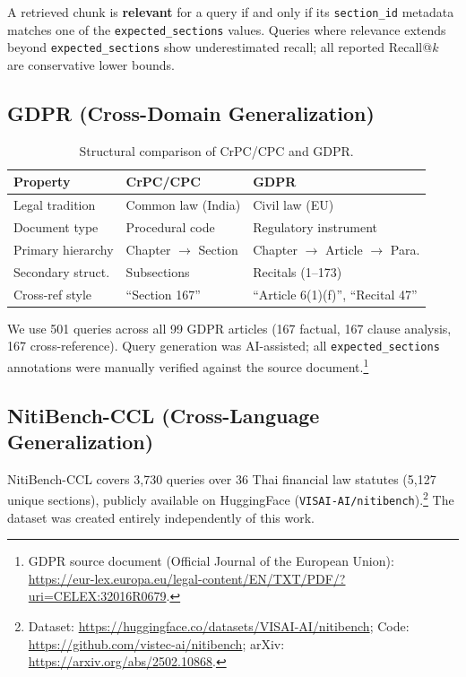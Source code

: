 \documentclass[sn-mathphys,Numbered]{sn-jnl}%
\begin{document}
A retrieved chunk is \textbf{relevant} for a query if and only if its
\texttt{section\_id} metadata matches one of the \texttt{expected\_sections}
values.  Queries where relevance extends beyond \texttt{expected\_sections}
show underestimated recall; all reported Recall@$k$ are conservative lower
bounds.

\subsection{GDPR (Cross-Domain Generalization)}

\begin{table}[htbp]
\centering
\begin{tabular}{lll}
\toprule
\textbf{Property} & \textbf{CrPC/CPC} & \textbf{GDPR} \\
\midrule
Legal tradition   & Common law (India)  & Civil law (EU) \\
Document type     & Procedural code     & Regulatory instrument \\
Primary hierarchy & Chapter $\to$ Section & Chapter $\to$ Article $\to$ Para.\\
Secondary struct. & Subsections         & Recitals (1--173) \\
Cross-ref style   & ``Section 167''     & ``Article 6(1)(f)'', ``Recital 47'' \\
\bottomrule
\end{tabular}
\caption{Structural comparison of CrPC/CPC and GDPR.}
\label{tab:doc_comparison}
\end{table}

We use 501 queries across all 99 GDPR articles (167 factual, 167 clause
analysis, 167 cross-reference).  Query generation was AI-assisted; all
\texttt{expected\_sections} annotations were manually verified against the
source document.\footnote{GDPR source document (Official Journal of the
  European Union): \url{https://eur-lex.europa.eu/legal-content/EN/TXT/PDF/?uri=CELEX:32016R0679}.}

\subsection{NitiBench-CCL (Cross-Language Generalization)}

NitiBench-CCL \cite{akarajaradwong2025nitibenchcomprehensivestudyllm} covers 3,730 queries
over 36 Thai financial law statutes (5,127 unique sections), publicly
available on HuggingFace (\texttt{VISAI-AI/nitibench}).\footnote{%
  Dataset: \url{https://huggingface.co/datasets/VISAI-AI/nitibench};
  Code: \url{https://github.com/vistec-ai/nitibench};
  arXiv: \url{https://arxiv.org/abs/2502.10868}.}
The dataset was
created entirely independently of this work.
\end{document}
